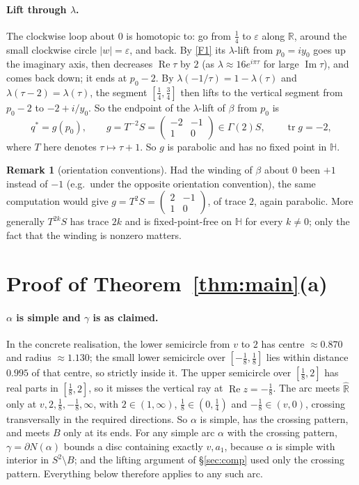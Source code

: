 \documentclass[11pt]{article}
\theoremstyle{definition}
\newtheorem{remark}[proposition]{Remark}
\newcommand{\Rh}{\hat{\mathbb R}}
\newcommand{\HH}{\mathbb H}
\newcommand{\Img}{\operatorname{Im}}
\newcommand{\Rea}{\operatorname{Re}}
\begin{document}
\paragraph{Lift through $\lambda$.} The clockwise loop about $0$ is homotopic to: go from $\tfrac14$ to $\varepsilon$ along $\mathbb R$, around the small clockwise circle $|w|=\varepsilon$, and back. By \ref{F1} its $\lambda$-lift from $p_0=iy_0$ goes up the imaginary axis, then decreases $\Rea\tau$ by $2$ (as $\lambda\approx16e^{i\pi\tau}$ for large $\Img\tau$), and comes back down; it ends at $p_0-2$. By $\lambda(-1/\tau)=1-\lambda(\tau)$ and $\lambda(\tau-2)=\lambda(\tau)$, the segment $[\tfrac14,\tfrac34]$ then lifts to the vertical segment from $p_0-2$ to $-2+i/y_0$. So the endpoint of the $\lambda$-lift of $\beta$ from $p_0$ is
\[q^*=g(p_0),\qquad g=T^{-2}S=\begin{pmatrix}-2&-1\\1&0\end{pmatrix}\in\Gamma(2)S,\qquad \operatorname{tr}g=-2,\]
where $T$ here denotes $\tau\mapsto\tau+1$. So $g$ is parabolic and has no fixed point in $\HH$.

\begin{remark}[orientation conventions]
Had the winding of $\beta$ about $0$ been $+1$ instead of $-1$ (e.g.\ under the opposite orientation convention), the same computation would give $g=T^{2}S=\begin{pmatrix}2&-1\\1&0\end{pmatrix}$, of trace $2$, again parabolic. More generally $T^{2k}S$ has trace $2k$ and is fixed-point-free on $\HH$ for every $k\ne0$; only the fact that the winding is nonzero matters.
\end{remark}

\section{Proof of Theorem~\ref{thm:main}(a)}\label{sec:proofa}

\paragraph{$\alpha$ is simple and $\gamma$ is as claimed.} In the concrete realisation, the lower semicircle from $v$ to $2$ has centre $\approx0.870$ and radius $\approx1.130$; the small lower semicircle over $[-\tfrac18,\tfrac18]$ lies within distance $0.995$ of that centre, so strictly inside it. The upper semicircle over $[\tfrac18,2]$ has real parts in $[\tfrac18,2]$, so it misses the vertical ray at $\Rea z=-\tfrac18$. The arc meets $\Rh$ only at $v,2,\tfrac18,-\tfrac18,\infty$, with $2\in(1,\infty)$, $\tfrac18\in(0,\tfrac14)$ and $-\tfrac18\in(v,0)$, crossing transversally in the required directions. So $\alpha$ is simple, has the crossing pattern, and meets $B$ only at its ends. For any simple arc $\alpha$ with the crossing pattern, $\gamma=\partial N(\alpha)$ bounds a disc containing exactly $v,a_1$, because $\alpha$ is simple with interior in $S^2\setminus B$; and the lifting argument of \S\ref{sec:comp} used only the crossing pattern. Everything below therefore applies to any such arc.
\end{document}
